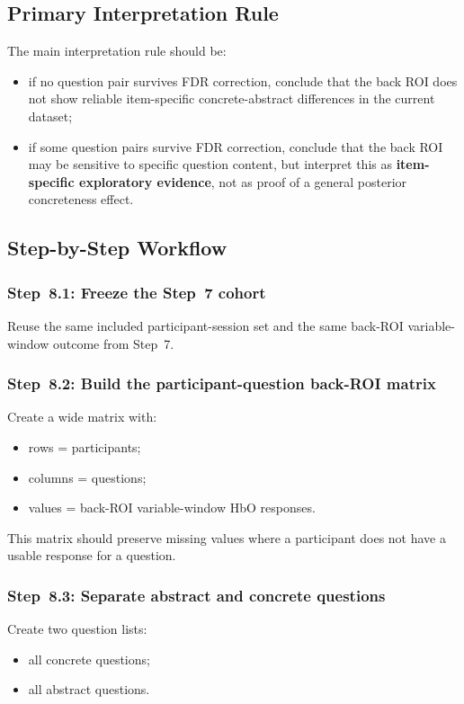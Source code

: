 \subsection{Primary Interpretation Rule}
The main interpretation rule should be:
\begin{itemize}
    \item if no question pair survives FDR correction, conclude that the back ROI does not show
    reliable item-specific concrete-abstract differences in the current dataset;
    \item if some question pairs survive FDR correction, conclude that the back ROI may be sensitive
    to specific question content, but interpret this as \textbf{item-specific exploratory evidence},
    not as proof of a general posterior concreteness effect.
\end{itemize}

\subsection{Step-by-Step Workflow}

\subsubsection{Step~8.1: Freeze the Step~7 cohort}
Reuse the same included participant-session set and the same back-ROI variable-window outcome from Step~7.

\subsubsection{Step~8.2: Build the participant-question back-ROI matrix}
Create a wide matrix with:
\begin{itemize}
    \item rows = participants;
    \item columns = questions;
    \item values = back-ROI variable-window HbO responses.
\end{itemize}

This matrix should preserve missing values where a participant does not have a usable response for a question.

\subsubsection{Step~8.3: Separate abstract and concrete questions}
Create two question lists:
\begin{itemize}
    \item all concrete questions;
    \item all abstract questions.
\end{itemize}

